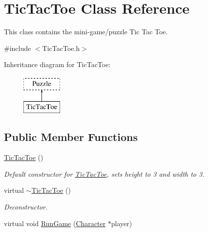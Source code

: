 \hypertarget{classTicTacToe}{\section{Tic\-Tac\-Toe Class Reference}
\label{classTicTacToe}
}


This class contains the mini-\/game/puzzle Tic Tac Toe.  




{\ttfamily \#include $<$Tic\-Tac\-Toe.\-h$>$}

Inheritance diagram for Tic\-Tac\-Toe\-:\begin{figure}[H]
\begin{center}
\leavevmode
\includegraphics[height=2.000000cm]{classTicTacToe}
\end{center}
\end{figure}
\subsection*{Public Member Functions}
\begin{DoxyCompactItemize}
\item 
\hyperlink{classTicTacToe_a103fe9a5ae41b5ef756e20594a70cb7a}{Tic\-Tac\-Toe} ()
\begin{DoxyCompactList}\small\item\em Default constructor for \hyperlink{classTicTacToe}{Tic\-Tac\-Toe}, sets height to 3 and width to 3. \end{DoxyCompactList}\item 
virtual \hyperlink{classTicTacToe_a5e9c4ed3279034d5530cc7b94a3e10e5}{$\sim$\-Tic\-Tac\-Toe} ()
\begin{DoxyCompactList}\small\item\em Deconstructor. \end{DoxyCompactList}\item 
virtual void \hyperlink{classTicTacToe_acf4f00b2f56781f0c41a4d51cfe03268}{Run\-Game} (\hyperlink{classCharacter}{Character} $\ast$player)
\end{DoxyCompactItemize}
